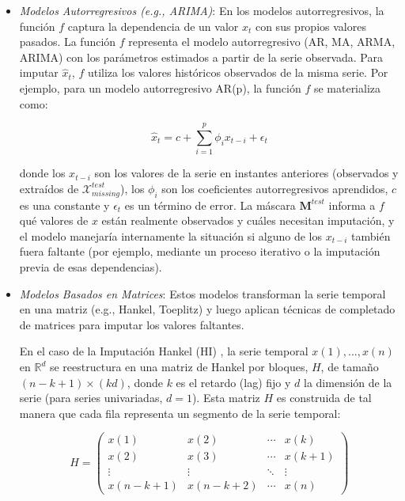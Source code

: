\begin{itemize}
\begin{itemize}
            \item \textit{Modelos Autorregresivos (e.g., ARIMA)}:
            En los modelos autorregresivos, la función $f$ captura la dependencia de un valor $x_t$ con sus propios valores pasados. La función $f$ representa el modelo autorregresivo (AR, MA, ARMA, ARIMA) con los parámetros estimados a partir de la serie observada.
            Para imputar $\hat{x}_t$, $f$ utiliza los valores históricos observados de la misma serie. Por ejemplo, para un modelo autorregresivo AR(p), la función $f$ se materializa como:
            
            \begin{equation}
            \hat{x}_t = c + \sum_{i=1}^p \phi_i x_{t-i} + \epsilon_t
            \end{equation}

            donde los $x_{t-i}$ son los valores de la serie en instantes anteriores (observados y extraídos de $\mathcal{X}_{missing}^{test}$), los $\phi_i$ son los coeficientes autorregresivos aprendidos, $c$ es una constante y $\epsilon_t$ es un término de error. La máscara $\mathbf{M}^{test}$ informa a $f$ qué valores de $x$ están realmente observados y cuáles necesitan imputación, y el modelo manejaría internamente la situación si alguno de los $x_{t-i}$ también fuera faltante (por ejemplo, mediante un proceso iterativo o la imputación previa de esas dependencias).

           \item \textit{Modelos Basados en Matrices}:
            Estos modelos transforman la serie temporal en una matriz (e.g., Hankel, Toeplitz) y luego aplican técnicas de completado de matrices para imputar los valores faltantes.
    
            En el caso de la Imputación Hankel (HI) \citep{PoudevigneJones24Hankel} , la serie temporal $x(1), \ldots, x(n)$ en $\mathbb{R}^d$ se reestructura en una matriz de Hankel por bloques, $H$, de tamaño $(n-k+1) \times (kd)$, donde $k$ es el retardo (lag) fijo y $d$ la dimensión de la serie (para series univariadas, $d=1$). Esta matriz $H$ es construida de tal manera que cada fila representa un segmento de la serie temporal:
    
            \[
            H = \begin{pmatrix}
            x(1) & x(2) & \cdots & x(k) \\
            x(2) & x(3) & \cdots & x(k+1) \\
            \vdots & \vdots & \ddots & \vdots \\
            x(n-k+1) & x(n-k+2) & \cdots & x(n)
            \end{pmatrix}
            \]
    

\end{itemize}
\end{itemize}
